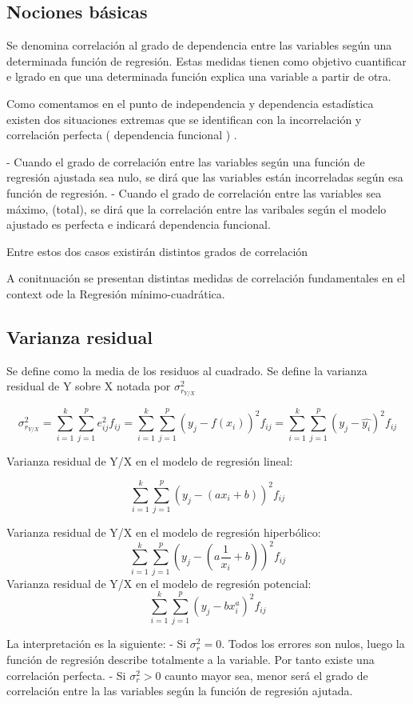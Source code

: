 \documentclass{article}
\begin{document}
\subsection{Nociones básicas}

Se denomina correlación al grado de dependencia entre las variables según una determinada función de regresión. Estas medidas tienen como objetivo cuantificar e lgrado en que una determinada función explica una variable a partir de otra. 

Como comentamos en el punto de independencia y dependencia estadística existen dos situaciones extremas que se identifican con la incorrelación y correlación perfecta ( dependencia funcional ) .

- Cuando el grado de correlación entre las variables según una función de regresión ajustada sea nulo, se dirá que las variables están incorreladas según esa función de regresión.
- Cuando el grado de correlación entre las variables sea máximo, (total), se dirá que la correlación entre las varibales según el modelo ajustado es perfecta e indicará dependencia funcional.

Entre estos dos casos existirán distintos grados de correlación

A conitnuación se presentan distintas medidas de correlación fundamentales en el context ode la Regresión mínimo-cuadrática.

\subsection{Varianza residual}
Se define como la media de los residuos al cuadrado. Se define la varianza residual de Y sobre X notada por $\sigma_{r_{Y/X}}^2 $

$$ \sigma_{r_{Y/X}}^2 = \sum_{i=1}^k \sum_{j=1}^p e_{ij}^2 f_{ij} =  \sum_{i=1}^k \sum_{j=1}^p ( y_j - f(x_i))^2 f_{ij} = \sum_{i=1}^k \sum_{j=1}^p (y_j -\hat{y_i})^2 f_{ij} $$

Varianza residual de Y/X en el modelo de regresión lineal:

$$ \sum_{i=1}^k \sum_{j=1}^p ( y_j - (ax_i +b) )^2 f_{ij} $$

Varianza residual de Y/X en el modelo de regresión hiperbólico:
$$ \sum_{i=1}^k \sum_{j=1}^p ( y_j - (a\frac{1}{x_i} +b) )^2 f_{ij} $$
Varianza residual de Y/X en el modelo de regresión potencial:
$$\sum_{i=1}^k \sum_{j=1}^p ( y_j - bx_i^a )^2 f_{ij} $$

La interpretación es la siguiente: 
- Si $\sigma_r^2 = 0$. Todos los errores son nulos, luego la función de regresión describe totalmente a la variable. Por tanto existe una correlación perfecta.
- Si $\sigma_r^2 > 0$ caunto mayor sea, menor será el grado de correlación entre la las variables según la función de regresión ajutada.
\end{document}
